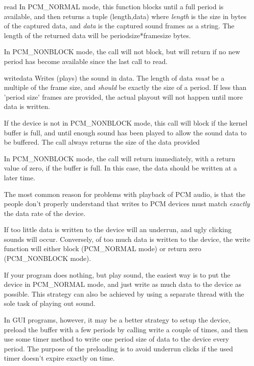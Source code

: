 \begin{methoddesc}[PCM]{read}{}
In PCM_NORMAL mode, this function blocks until a full period is available, and then returns a
tuple (length,data) where \emph{length} is the size in bytes of the captured data, and \emph{data}
is the captured sound frames as a string. The length of the returned data will be periodsize*framesize
bytes.

In PCM_NONBLOCK mode, the call will not block, but will return  if no new period
has become available since the last call to read.
\end{methoddesc}

\begin{methoddesc}[PCM]{write}{data}
Writes (plays) the sound in data. The length of data \emph{must} be a multiple of the frame size, and 
\emph{should} be exactly the size of a period. If less than 'period size' frames are provided, the actual
playout will not happen until more data is written.

If the device is not in PCM_NONBLOCK mode, this call will block if the kernel buffer is full, and
until enough sound has been played to allow the sound data to be buffered. The call always returns
the size of the data provided

In PCM_NONBLOCK mode, the call will return immediately, with a return value of zero, if the buffer is
full. In this case, the data should be written at a later time.

\end{methoddesc}


The most common reason for problems with playback of PCM audio, is that the people don't properly understand
that writes to PCM devices must match \emph{exactly} the data rate of the device.

If too little data is written to the device will an underrun, and  ugly clicking sounds will occur. Conversely,
of too much data is written to the device, the write function will either block (PCM_NORMAL mode) or return zero
(PCM_NONBLOCK mode).

If your program does nothing, but play sound, the easiest way is to put the device in PCM_NORMAL mode, and just
write as much data to the device as possible. This strategy can also be achieved by using a separate thread
with the sole task of playing out sound.

In GUI programs, however, it may be a better strategy to setup the device, preload the buffer with a few
periods by calling write a couple of times, and then use some timer method to write one period size of data to
the device every period. The purpose of the preloading is to avoid underrun clicks if the used timer
doesn't expire exactly on time.

